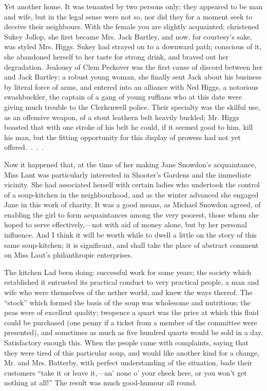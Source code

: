 Yet another home. It was tenanted by two persons only; they appeared to
be man and wife, but in the legal sense were not so, nor did they for a
moment seek to deceive their neighbours. With the female you are
slightly acquainted; christened Sukey Jollop, she first became Mrs. Jack
Bartley, and now, for courtesy's sake, was styled Mrs. Higgs. Sukey had
strayed on to a downward path; conscious of it, she abandoned herself to
her taste for strong drink, and braved out her degradation. Jealousy of
Clem Peckover was the first cause of discord between her and Jack
Bartley; a robust young woman, she finally sent Jack about his business
by literal force of arms, and entered into an alliance with Ned Higgs, a
notorious swashbuckler, the captain of a gang of young ruffians who at
this date were giving much trouble to the Clerkenwell police. Their
specialty was the skilful use, as an offensive weapon, of a stout
leathern belt heavily buckled; Mr. Higgs boasted that with one stroke of
his belt he could, if it seemed good {}to him, kill his man, but the
fitting opportunity for this display of prowess had not yet
offered{.~.~.~.}

Now it happened that, at the time of her making Jane Snowdon's
acquaintance, Miss Lant was particularly interested in Shooter's Gardens
and the immediate vicinity. She had associated herself with certain
ladies who undertook the control of a soup-kitchen in the neighbourhood,
and as the winter advanced she engaged Jane in this work of charity. It
was a good means, as Michael Snowdon agreed, of enabling the girl to
form acquaintances among the very poorest, those whom she hoped to serve
effectively,---not with aid of money alone, but by her personal
influence. And I think it will be worth while to dwell a little on the
story of this same soup-kitchen; it is significant, and shall take the
place of abstract comment on Miss Laut's philanthropic enterprises.

The kitchen Lad been doing: successful work for some years; the society
which established it entrusted its practical conduct to very practical
people, a man and wife who were themselves of the nether world, and knew
the ways {}thereof. The ``stock'' which formed the basis of the soup was
wholesome and nutritious; the peas were of excellent quality; twopence a
quart was the price at which this fluid could be purchased (one penny if
a ticket from a member of the committee were presented), and sometimes
as much as five hundred quarts would be sold in a day. Satisfactory
enough this. When the people came with complaints, saying that they were
tired of this particular soup, and would like another kind for a change,
Mr. and Mrs. Batterby, with perfect understanding of the situation, bade
their customers ``take it or leave it,---an' none o' your cheek here, or
you won't get nothing at all!'' The result was much good-humour all
round.

